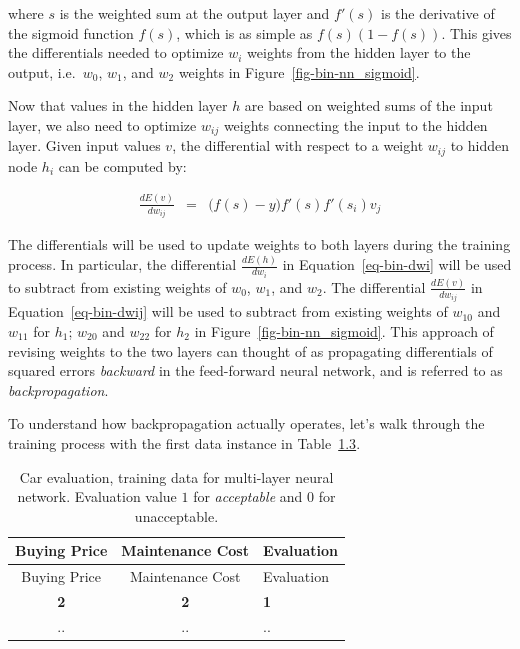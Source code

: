 \documentclass[
  letterpaper,
]{scrbook}
\begin{document}
where \(s\) is the weighted sum at the output layer and \(f'(s)\) is the
derivative of the sigmoid function \(f(s)\), which is as simple as
\(f(s)(1-f(s))\). This gives the differentials needed to optimize
\(w_i\) weights from the hidden layer to the output, i.e.~\(w_0\),
\(w_1\), and \(w_2\) weights in Figure~\ref{fig-bin-nn_sigmoid}.

Now that values in the hidden layer \(h\) are based on weighted sums of
the input layer, we also need to optimize \(w_{ij}\) weights connecting
the input to the hidden layer. Given input values \(v\), the
differential with respect to a weight \(w_{ij}\) to hidden node \(h_i\)
can be computed by:

\[\begin{aligned}
  \frac{dE(v)}{dw_{ij}}
  & = & \big( f(s) - y \big) f'(s) f'(s_i) v_j
\end{aligned}\]

The differentials will be used to update weights to both layers during
the training process. In particular, the differential
\(\frac{dE(h)}{dw_i}\) in
Equation~\hyperref[eq-bin-dwi]{{[}eq-bin-dwi{]}} will be used to
subtract from existing weights of \(w_0\), \(w_1\), and \(w_2\). The
differential \(\frac{dE(v)}{dw_{ij}}\) in
Equation~\hyperref[eq-bin-dwij]{{[}eq-bin-dwij{]}} will be used to
subtract from existing weights of \(w_{10}\) and \(w_{11}\) for \(h_1\);
\(w_{20}\) and \(w_{22}\) for \(h_2\) in
Figure~\ref{fig-bin-nn_sigmoid}. This approach of revising weights to
the two layers can thought of as propagating differentials of squared
errors \emph{backward} in the feed-forward neural network, and is
referred to as \emph{backpropagation}.

To understand how backpropagation actually operates, let's walk through
the training process with the first data instance in
Table~\hyperref[tab-bin-car_nn]{1.3}.

\protect{}\label{tab-bin-car_nn}
\begin{longtable}[]{@{}ccl@{}}
\caption{Car evaluation, training data for multi-layer neural network.
Evaluation value \(1\) for \emph{acceptable} and \(0\) for
unacceptable.}\tabularnewline
\toprule\noalign{}
Buying Price & Maintenance Cost & Evaluation \\
\midrule\noalign{}
\endfirsthead
\toprule\noalign{}
Buying Price & Maintenance Cost & Evaluation \\
\midrule\noalign{}
\endhead
\bottomrule\noalign{}
\endlastfoot
\textbf{2} & \textbf{2} & \textbf{1} \\
.. & .. & .. \\
\end{longtable}
\end{document}
